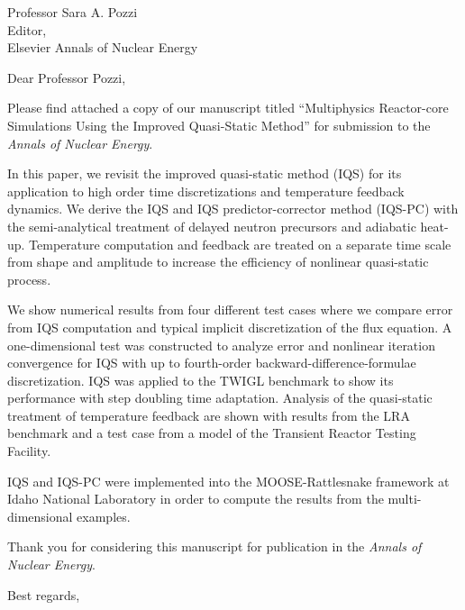 \begin{letter}{Professor Sara A. Pozzi\\
    Editor,\\
    Elsevier Annals of Nuclear Energy}
\date{\today}

\opening{Dear Professor Pozzi,}
         \vspace{0.25cm}

Please find attached a copy of our manuscript titled ``Multiphysics Reactor-core Simulations Using the Improved Quasi-Static Method'' for submission to the {\em Annals of Nuclear Energy}. 

In this paper, we revisit the improved quasi-static method (IQS) for its application to high order time discretizations and temperature feedback dynamics. We derive the IQS and IQS predictor-corrector method (IQS-PC) with the semi-analytical treatment of delayed neutron precursors and adiabatic heat-up. Temperature computation and feedback are treated on a separate time scale from shape and amplitude to increase the efficiency of nonlinear quasi-static process.

We show numerical results from four different test cases where we compare error from IQS computation and typical implicit discretization of the flux equation. A one-dimensional test was constructed to analyze error and nonlinear iteration convergence for IQS with up to fourth-order backward-difference-formulae discretization. IQS was applied to the TWIGL benchmark to show its performance with step doubling time adaptation. Analysis of the quasi-static treatment of temperature feedback are shown with results from the LRA benchmark and a test case from a model of the Transient Reactor Testing Facility. 

IQS and IQS-PC were implemented into the MOOSE-Rattlesnake framework at Idaho National Laboratory in order to compute the results from the multi-dimensional examples.

Thank you for considering this manuscript for publication in the {\it Annals of Nuclear Energy}.

\vspace{0.25cm}



\closing{Best regards, }

\end{letter}


